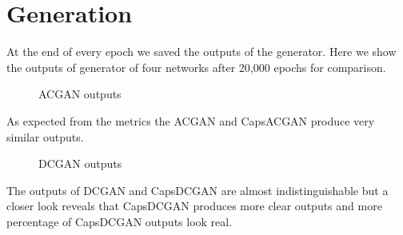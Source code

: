 \section{Generation} %
\label{sec:generation}
At the end of every epoch we saved the outputs of the generator. Here we show the outputs of generator of four networks after 20,000 epochs for comparison.
\begin{figure}[H]
    \centering
    \caption{ACGAN outputs}%
    \label{fig:acgan_gen}%
\end{figure}
As expected from the metrics the ACGAN and CapsACGAN produce very similar outputs.
\begin{figure}[H]
    \centering
    \qquad
    \caption{DCGAN outputs}%
    \label{fig:dcgan_gen}%
\end{figure}
The outputs of DCGAN and CapsDCGAN are almost indistinguishable but a closer look reveals that CapsDCGAN produces more clear outputs and more percentage of CapsDCGAN outputs look real.

